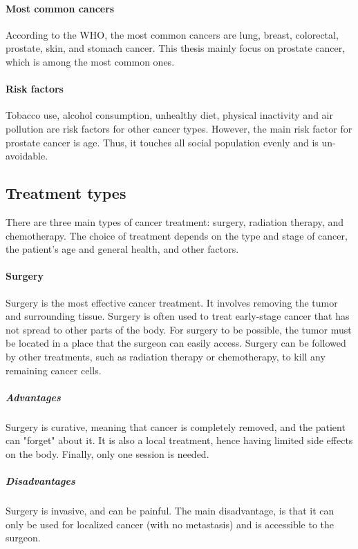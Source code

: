 \paragraph{Most common cancers}
According to the WHO, the most common cancers are lung, breast, colorectal, prostate, skin, and stomach cancer.
This thesis mainly focus on prostate cancer, which is among the most common ones.

\paragraph{Risk factors}
Tobacco use, alcohol consumption, unhealthy diet, physical inactivity and air pollution are risk factors for other cancer types.
However, the main risk factor for prostate cancer is age.
Thus, it touches all social population evenly and is un-avoidable.

\subsection{Treatment types}

There are three main types of cancer treatment: surgery, radiation therapy, and chemotherapy.
The choice of treatment depends on the type and stage of cancer, the patient's age and general health, and other factors.

\paragraph{Surgery}
Surgery is the most effective cancer treatment.
It involves removing the tumor and surrounding tissue.
Surgery is often used to treat early-stage cancer that has not spread to other parts of the body.
For surgery to be possible, the tumor must be located in a place that the surgeon can easily access.
Surgery can be followed by other treatments, such as radiation therapy or chemotherapy, to kill any remaining cancer cells.

\subparagraph{Advantages}
Surgery is curative, meaning that cancer is completely removed, and the patient can "forget" about it.
It is also a local treatment, hence having limited side effects on the body.
Finally, only one session is needed.

\subparagraph{Disadvantages}
Surgery is invasive, and can be painful.
The main disadvantage, is that it can only be used for localized cancer (with no metastasis) and is accessible to the surgeon.

